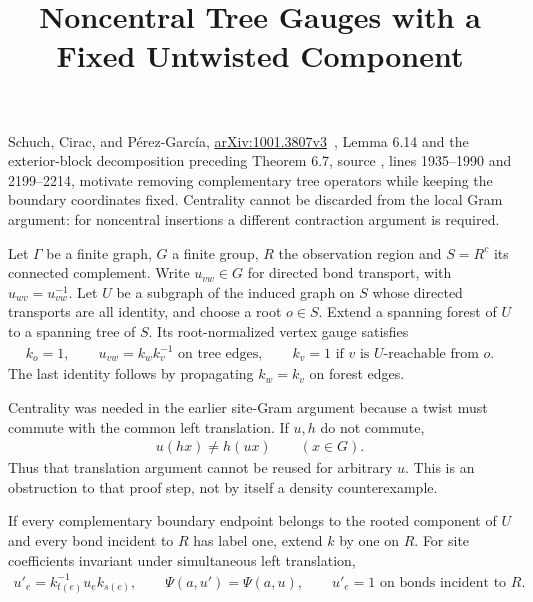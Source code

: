 \documentclass{article}
\title{Noncentral Tree Gauges with a Fixed Untwisted Component}
\author{}
\date{}
\begin{document}
\maketitle
{}

Schuch, Cirac, and P\'erez-Garc\'ia,
\href{https://arxiv.org/abs/1001.3807v3}{arXiv:1001.3807v3}~\cite{Schuch2010PEPS},
Lemma 6.14 and the exterior-block decomposition preceding Theorem 6.7, source
, lines 1935--1990 and 2199--2214,
motivate removing complementary tree operators while keeping the boundary
coordinates fixed. Centrality cannot be discarded from the local Gram
argument: for noncentral insertions a different contraction argument is
required.

Let $\Gamma$ be a finite graph, $G$ a finite group, $R$ the observation
region and $S=R^c$ its connected complement. Write $u_{vw}\in G$ for
directed bond transport, with $u_{wv}=u_{vw}^{-1}$. Let $U$ be a subgraph
of the induced graph on $S$ whose directed transports are all identity,
and choose a root $o\in S$. Extend a spanning forest of $U$ to a spanning
tree of $S$. Its root-normalized vertex gauge satisfies
\begin{align}
    k_o=1,\qquad u_{vw}=k_wk_v^{-1}\text{ on tree edges},\qquad
    k_v=1\text{ if }v\text{ is }U\text{-reachable from }o.
    \label{eq:scp10_anchored_tree_fixed}
\end{align}
The last identity follows by propagating $k_w=k_v$ on forest edges.

Centrality was needed in the earlier site-Gram argument because a twist
must commute with the common left translation. If $u,h$ do not commute,
\begin{align}
    u(hx)\ne h(ux)\qquad(x\in G).
    \label{eq:scp10_anchored_tree_noncentral}
\end{align}
Thus that translation argument cannot be reused for arbitrary $u$.
This is an obstruction to that proof step, not by itself a density counterexample.

If every complementary boundary endpoint belongs to the rooted component
of $U$ and every bond incident to $R$ has label one, extend $k$ by one on $R$.
For site coefficients invariant under simultaneous left translation,
\begin{align}
    u'_e=k_{t(e)}^{-1}u_ek_{s(e)},\qquad
    \Psi(a,u')=\Psi(a,u),\qquad
    u'_e=1\text{ on bonds incident to }R.
    \label{eq:scp10_anchored_tree_global}
\end{align}
\end{document}
